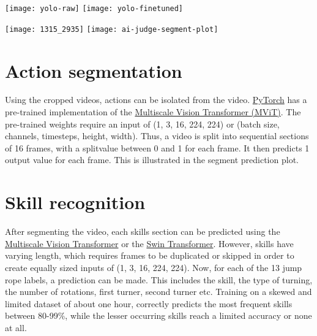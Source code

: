 \documentclass[english,a0,portrait]{hogent-poster}
\begin{document}
\begin{multicols}{2}
\begin{center}
  \captionsetup{type=figure}
  \texttt{[image: yolo-raw]}
  \texttt{[image: yolo-finetuned]}
\end{center}

\begin{center}
  \captionsetup{type=figure}
  \texttt{[image: 1315\_2935]}
  \texttt{[image: ai-judge-segment-plot]}
\end{center}

\section{Action segmentation}

Using the cropped videos, actions can be isolated from the video. \href{https://pytorch.org/vision/main/models/video_mvit.html}{PyTorch} has a pre-trained implementation of the \href{10.48550/ARXIV.2104.11227}{Multiscale Vision Transformer (MViT)}.
The pre-trained weights require an input of (1, 3, 16, 224, 224) or (batch size, channels, timesteps, height, width). Thus, a video is split into sequential sections of 16 frames, with a splitvalue between 0 and 1 for each frame. It then predicts 1 output value for each frame. This is illustrated in the segment prediction plot.

\section{Skill recognition}

After segmenting the video, each skills section can be predicted using the \href{10.48550/ARXIV.2104.11227}{Multiscale Vision Transformer} or the \href{https://doi.org/10.48550/arXiv.2103.14030}{Swin Transformer}. However, skills have varying length, which requires frames to be duplicated or skipped in order to create equally sized inputs of (1, 3, 16, 224, 224). Now, for each of the 13 jump rope labels, a prediction can be made. This includes the skill, the type of turning, the number of rotations, first turner, second turner etc. Training on a skewed and limited dataset of about one hour, correctly predicts the most frequent skills between 80-99\%, while the lesser occurring skills reach a limited accuracy or none at all.


\end{multicols}
\end{document}
